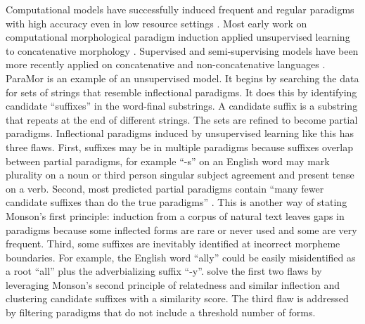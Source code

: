 \documentclass[12pt]{article}
\begin{document}
Computational models have successfully induced frequent and regular paradigms with high accuracy even in low resource settings \cite{hammarstrom_unsupervised_2011,durrett_supervised_2013,ahlberg_semi-supervised_2014}. Most early work on computational morphological paradigm induction applied unsupervised learning to concatenative morphology \cite{goldsmith_unsupervised_2001,chan_learning_2006,monson_paramorfinding_2007b}. Supervised and semi-supervising models have been more recently applied on concatenative and non-concatenative languages \cite{dreyer_discovering_2011,durrett_supervised_2013}. ParaMor \cite{monson_paramorMinimally_2007a} is an example of an unsupervised model. It begins by searching the data for sets of strings that resemble inflectional paradigms. It does this by identifying candidate ``suffixes'' in the word-final substrings. A candidate suffix is a substring that repeats at the end of different strings. The sets are refined to become partial paradigms. Inflectional paradigms induced by unsupervised learning like this has three flaws. First, suffixes may be in multiple paradigms because suffixes overlap between partial paradigms, for example ``-s'' on an English word may mark plurality on a noun or third person singular subject agreement and present tense on a verb. Second, most predicted partial paradigms contain ``many fewer candidate suffixes than do the true paradigms'' \cite[page 903]{monson_paramorfinding_2007b}. This is another way of stating Monson's first principle: induction from a corpus of natural text leaves gaps in paradigms because some inflected forms are rare or never used and some are very frequent. Third, some suffixes are inevitably identified at incorrect morpheme boundaries. For example, the English word ``ally'' could be easily misidentified as a root ``all'' plus the adverbializing suffix  ``-y''.  solve the first two flaws by leveraging Monson's second principle of relatedness and similar inflection and clustering candidate suffixes with a similarity score. The third flaw is addressed by filtering paradigms that do not include a threshold number of forms.  
\end{document}
